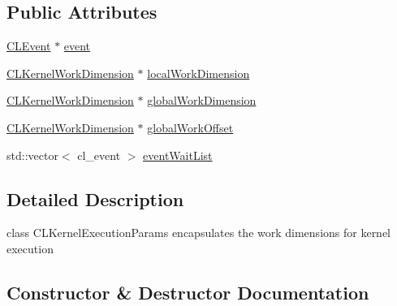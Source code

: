 \subsection*{Public Attributes}
\begin{DoxyCompactItemize}
\item 
\hyperlink{class_c_l_ray_tracer_1_1_open_c_l_utils_1_1_c_l_event}{C\+L\+Event} $\ast$ \hyperlink{class_c_l_ray_tracer_1_1_open_c_l_utils_1_1_c_l_kernel_execute_params_a8debf260792693a64c01904ed43004c3}{event}
\item 
\hyperlink{class_c_l_ray_tracer_1_1_open_c_l_utils_1_1_c_l_kernel_work_dimension}{C\+L\+Kernel\+Work\+Dimension} $\ast$ \hyperlink{class_c_l_ray_tracer_1_1_open_c_l_utils_1_1_c_l_kernel_execute_params_ae0daedd4a1726c9ffa43b38f8e6c9920}{local\+Work\+Dimension}
\item 
\hyperlink{class_c_l_ray_tracer_1_1_open_c_l_utils_1_1_c_l_kernel_work_dimension}{C\+L\+Kernel\+Work\+Dimension} $\ast$ \hyperlink{class_c_l_ray_tracer_1_1_open_c_l_utils_1_1_c_l_kernel_execute_params_af62889e5fd651360d69ee92e23977bda}{global\+Work\+Dimension}
\item 
\hyperlink{class_c_l_ray_tracer_1_1_open_c_l_utils_1_1_c_l_kernel_work_dimension}{C\+L\+Kernel\+Work\+Dimension} $\ast$ \hyperlink{class_c_l_ray_tracer_1_1_open_c_l_utils_1_1_c_l_kernel_execute_params_aeaddbee87bcc68e36a78b517c8cddbd8}{global\+Work\+Offset}
\item 
std\+::vector$<$ cl\+\_\+event $>$ \hyperlink{class_c_l_ray_tracer_1_1_open_c_l_utils_1_1_c_l_kernel_execute_params_a2319b0deec1732ec481a75d4b188f789}{event\+Wait\+List}
\end{DoxyCompactItemize}


\subsection{Detailed Description}
class C\+L\+Kernel\+Execution\+Params encapsulates the work dimensions for kernel execution 

\subsection{Constructor \& Destructor Documentation}
